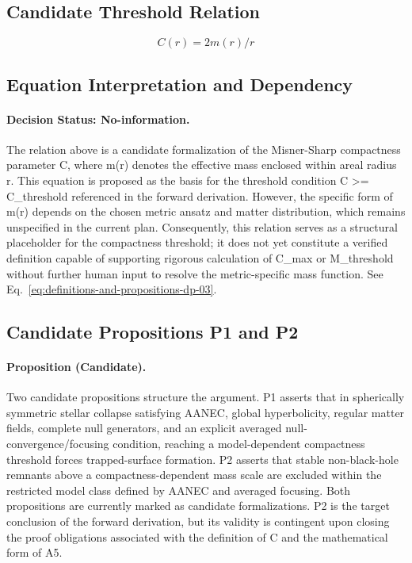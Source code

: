\documentclass[conference]{IEEEtran}
\begin{document}
\subsection{Candidate Threshold Relation}
\begin{equation}
C(r) = 2m(r) / r
\label{eq:definitions-and-propositions-dp-03}
\end{equation}

\subsection{Equation Interpretation and Dependency}
\paragraph{Decision Status: No-information.} The relation above is a candidate formalization of the Misner-Sharp compactness parameter C, where m(r) denotes the effective mass enclosed within areal radius r. This equation is proposed as the basis for the threshold condition C >= C\_threshold referenced in the forward derivation. However, the specific form of m(r) depends on the chosen metric ansatz and matter distribution, which remains unspecified in the current plan. Consequently, this relation serves as a structural placeholder for the compactness threshold; it does not yet constitute a verified definition capable of supporting rigorous calculation of C\_max or M\_threshold without further human input to resolve the metric-specific mass function. See Eq.~\eqref{eq:definitions-and-propositions-dp-03}.

\subsection{Candidate Propositions P1 and P2}
\paragraph{Proposition (Candidate).} Two candidate propositions structure the argument. P1 asserts that in spherically symmetric stellar collapse satisfying AANEC, global hyperbolicity, regular matter fields, complete null generators, and an explicit averaged null-convergence/focusing condition, reaching a model-dependent compactness threshold forces trapped-surface formation. P2 asserts that stable non-black-hole remnants above a compactness-dependent mass scale are excluded within the restricted model class defined by AANEC and averaged focusing. Both propositions are currently marked as candidate formalizations. P2 is the target conclusion of the forward derivation, but its validity is contingent upon closing the proof obligations associated with the definition of C and the mathematical form of A5.
\end{document}

